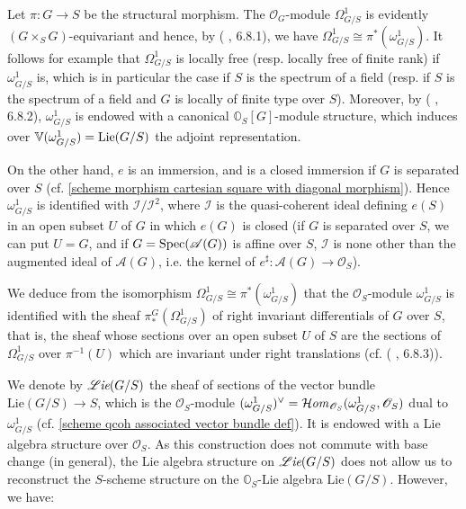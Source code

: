 \begin{remark}\label{scheme group omega_G/S differential module prop}
Let $\pi:G\to S$ be the structural morphism. The $\mathscr{O}_G$-module $\Omega_{G/S}^1$ is evidently $(G\times_SG)$-equivariant and hence, by (\cite{SGA3} , 6.8.1), we have $\Omega_{G/S}^1\cong\pi^*(\omega_{G/S}^1)$. It follows for example that $\Omega_{G/S}^1$ is locally free (resp. locally free of finite rank) if $\omega_{G/S}^1$ is, which is in particular the case if $S$ is the spectrum of a field (resp. if $S$ is the spectrum of a field and $G$ is locally of finite type over $S$). Moreover, by (\cite{SGA3} , 6.8.2), $\omega_{G/S}^1$ is endowed with a canonical $\mathbb{O}_S[G]$-module structure, which induces over $\mathbb{V}(\omega_{G/S}^1)=\mathrm{Lie}(G/S)$ the adjoint representation.\par
On the other hand, $e$ is an immersion, and is a closed immersion if $G$ is separated over $S$ (cf. \cref{scheme morphism cartesian square with diagonal morphism}). Hence $\omega_{G/S}^1$ is identified with $\mathscr{I}/\mathscr{I}^2$, where $\mathscr{I}$ is the quasi-coherent ideal defining $e(S)$ in an open subset $U$ of $G$ in which $e(G)$ is closed (if $G$ is separated over $S$, we can put $U=G$, and if $G=\mathrm{Spec}(\mathscr{A}(G))$ is affine over $S$, $\mathscr{I}$ is none other than the augmented ideal of $\mathscr{A}(G)$, i.e. the kernel of $e^{\sharp}:\mathscr{A}(G)\to\mathscr{O}_S$).
\end{remark}

\begin{remark}\label{scheme group omega_G/S invariant sheaf of differential}
We deduce from the isomorphism $\Omega_{G/S}^1\cong\pi^*(\omega_{G/S}^1)$ that the $\mathscr{O}_S$-module $\omega_{G/S}^1$ is identified with the sheaf $\pi_*^G(\Omega_{G/S}^1)$ of right invariant differentials of $G$ over $S$, that is, the sheaf whose sections over an open subset $U$ of $S$ are the sections of $\Omega_{G/S}^1$ over $\pi^{-1}(U)$ which are invariant under right translations (cf. (\cite{SGA3} , 6.8.3)).
\end{remark}

We denote by $\operatorname{\mathscr{L}\hspace*{-0.5pt}\textit{ie}}(G/S)$ the sheaf of sections of the vector bundle $\mathrm{Lie}(G/S)\to S$, which is the $\mathscr{O}_S$-module $(\omega_{G/S}^1)^{\vee}=\operatorname{\mathcal{H}\hspace*{-0.4pt}\textit{om}\hspace{0.5pt}}_{\mathscr{O}_S}(\omega_{G/S}^1,\mathscr{O}_S)$ dual to $\omega_{G/S}^1$ (cf. \cref{scheme qcoh associated vector bundle def}). It is endowed with a Lie algebra structure over $\mathscr{O}_S$. As this construction does not commute with base change (in general), the Lie algebra structure on $\operatorname{\mathscr{L}\hspace*{-0.5pt}\textit{ie}}(G/S)$ does not allow us to reconstruct the $S$-scheme structure on the $\mathbb{O}_S$-Lie algebra $\mathrm{Lie}(G/S)$. However, we have:

